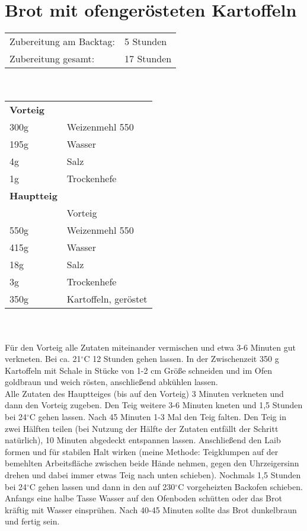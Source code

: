 \section{Brot mit ofengerösteten Kartoffeln}
\begin{tabular}{ll}
    Zubereitung am Backtag: & 5 Stunden  \\
    Zubereitung gesamt:     & 17 Stunden
\end{tabular}\\\paragraph*{}
\begin{tabular}{ll}
    \textbf{Vorteig} \\
    300g & Weizenmehl 550       \\
    195g & Wasser               \\
    4g   & Salz                 \\
    1g   & Trockenhefe          \\
    \textbf{Hauptteig} \\
    & Vorteig              \\
    550g & Weizenmehl 550       \\
    415g & Wasser               \\
    18g  & Salz                 \\
    3g   & Trockenhefe          \\
    350g & Kartoffeln, geröstet
\end{tabular}\\\paragraph*{}
Für den Vorteig alle Zutaten miteinander vermischen und etwa 3-6 Minuten gut verkneten. Bei ca. 21$^\circ$C 12 Stunden gehen lassen. In der Zwischenzeit 350 g Kartoffeln mit Schale in Stücke von 1-2 cm Größe schneiden und im Ofen goldbraun und weich rösten, anschließend abkühlen lassen.\\
Alle Zutaten des Hauptteiges (bis auf den Vorteig) 3 Minuten verkneten und dann den Vorteig zugeben. Den Teig weitere 3-6 Minuten kneten und 1,5 Stunden bei 24$^\circ$C gehen lassen. Nach 45 Minuten 1-3 Mal den Teig falten. Den Teig in zwei Hälften teilen (bei Nutzung der Hälfte der Zutaten entfällt der Schritt natürlich), 10 Minuten abgedeckt entspannen lassen. Anschließend den Laib formen und für stabilen Halt wirken (meine Methode: Teigklumpen auf der bemehlten Arbeitsfläche zwischen beide Hände nehmen, gegen den Uhrzeigersinn drehen und dabei immer etwas Teig nach unten schieben). Nochmals 1,5 Stunden bei 24$^\circ$C gehen lassen und dann in den auf 230$^\circ$C vorgeheizten Backofen schieben. Anfangs eine halbe Tasse Wasser auf den Ofenboden schütten oder das Brot kräftig mit Wasser einsprühen. Nach 40-45 Minuten sollte das Brot dunkelbraun und fertig sein.
\newpage


